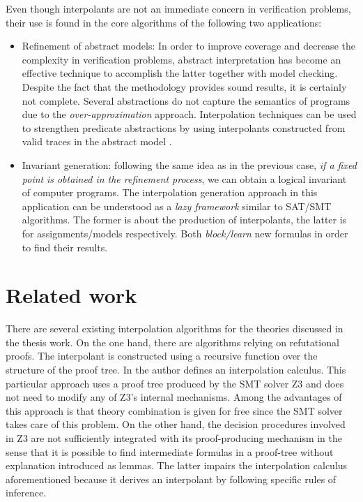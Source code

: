 Even though interpolants are not an 
immediate concern in verification
problems, their use is found in the 
core algorithms of the 
following two applications:

\begin{itemize}
  \item Refinement of abstract models: In order to improve 
    coverage and decrease the complexity in verification problems,
    abstract interpretation has become an 
    effective technique to 
    accomplish the latter together with 
    model checking. Despite the fact that 
    the methodology provides sound results, it is certainly not complete.
    Several abstractions do not capture the
    semantics of programs due to the \emph{over-approximation} approach.
    Interpolation techniques can be used 
    to strengthen predicate
    abstractions by using interpolants constructed from valid 
    traces in the abstract model \cite{10.1145/876638.876643,
    10.1007/978-3-540-45069-6_1, 10.1145/982962.964021}.
  \item Invariant generation: following the same idea as in the previous
    case, \emph{if a fixed point} \cite{10.1007/11691372_33} 
    \emph{is obtained in the refinement process},
    we can obtain a logical invariant of computer programs.
    The interpolation generation approach in this application can 
    be understood as a \emph{lazy framework}
    similar to SAT/SMT algorithms. The former is
    about the production of interpolants, the latter is for 
    assignments/models respectively. Both \emph{block/learn} 
    new formulas in order to find their results.
\end{itemize}

\section{Related work}

There are several existing interpolation algorithms for the theories
discussed in the thesis work. On the one hand, there are algorithms
relying on refutational proofs. The interpolant is constructed using a
recursive function over the structure of the proof
tree. In \cite{10.1007/978-3-540-24730-2_2,mcmillan2011interpolants}
the author defines an interpolation calculus. This particular
approach uses a proof tree produced by the SMT solver Z3 
and does not need to modify any of Z3's internal mechanisms.
Among the advantages of this approach is that
theory combination is given for free since the SMT solver takes 
care of this problem. On the other hand, the decision procedures
involved in Z3 are not sufficiently integrated with its proof-producing 
mechanism in the sense that it is possible to find 
intermediate formulas in a proof-tree without explanation
introduced as lemmas. 
The latter impairs the interpolation calculus aforementioned 
because it derives an interpolant by following specific 
rules of inference.


